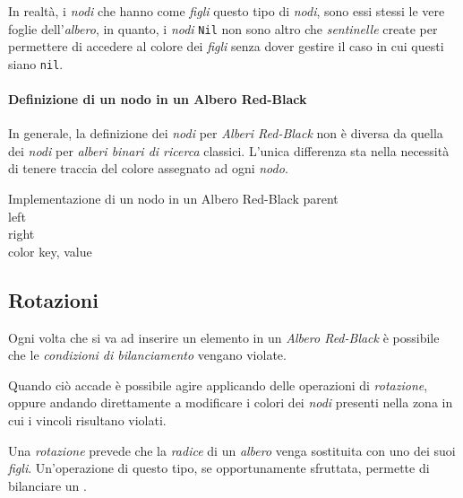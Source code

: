 In realtà, i \emph{nodi} che hanno come \emph{figli} questo tipo di \emph{nodi},
sono essi stessi le vere foglie dell'\emph{albero}, in quanto, i \emph{nodi}
\texttt{Nil} non sono altro che \emph{sentinelle} create per permettere di
accedere al colore dei \emph{figli} senza dover gestire il caso in cui questi
siano \texttt{nil}.

\paragraph{Definizione di un nodo in un Albero Red-Black}
In generale, la definizione dei \emph{nodi} per \emph{Alberi Red-Black} non è
diversa da quella dei \emph{nodi} per \emph{alberi binari di ricerca} classici.
L'unica differenza sta nella necessità di tenere traccia del colore assegnato ad
ogni \emph{nodo}.

\begin{code}{Implementazione di un nodo in un Albero Red-Black}
     parent\\
     left\\
     right\\
     color\hfill{}
     key, value
\end{code}

\subsection{Rotazioni}
Ogni volta che si va ad inserire un elemento in un \emph{Albero Red-Black} è
possibile che le \emph{condizioni di bilanciamento} vengano violate.

Quando ciò accade è possibile agire applicando delle operazioni di
\emph{rotazione}, oppure andando direttamente a modificare i colori dei \emph{nodi}
presenti nella zona in cui i vincoli risultano violati.

Una \emph{rotazione} prevede che la \emph{radice} di un \emph{albero} venga
sostituita con uno dei suoi \emph{figli}. Un'operazione di questo tipo, se
opportunamente sfruttata, permette di bilanciare un .

